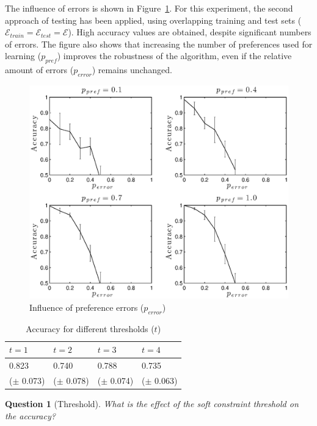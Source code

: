 \documentclass[letterpaper]{article}
\newcommand{\sym}[1]{\ensuremath{\mathcal{#1}}}
\newtheorem{question}{Question}
\theoremstyle{definition}
\begin{document}
The influence of errors is shown in Figure~\ref{fig:ruis}.
For this experiment, the second approach of testing has been applied, using overlapping training and test sets ($\sym{E}_{train} = \sym{E}_{test} = \sym{E}$).
High accuracy values are obtained, despite significant numbers of errors.
The figure also shows that increasing the number of preferences used for learning ($p_{pref}$) improves the robustness of the algorithm, even if the relative amount of errors ($p_{error}$) remains unchanged.

\begin{figure}
  \centering
    \includegraphics[width=1\linewidth]{errors}
  \caption{Influence of preference errors ($p_{error}$)}
  \label{fig:ruis}
\end{figure}

  \begin{table}[!htp]
    \caption{Accuracy for different thresholds ($t$)}
    \begin{tabularx}{\linewidth}{XXXX}
      $t = 1$ & $t = 2$ & $t = 3$ & $t = 4$ \\
      \toprule
     0.823 & 0.740 & 0.788 & 0.735 \\
     ($\pm$ 0.073) & ($\pm$ 0.078) & ($\pm$ 0.074) & ($\pm$ 0.063)
    \end{tabularx}
    \label{tbl:limiet}
  \end{table}

\begin{question}[Threshold]
  What is the effect of the soft constraint threshold on the accuracy?
\end{question}
\end{document}
